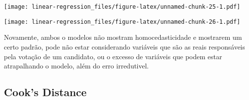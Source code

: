 \documentclass[]{article}
\newenvironment{Shaded}{\begin{snugshade}}{\end{snugshade}}
\newcommand{\KeywordTok}[1]{\textcolor[rgb]{0.13,0.29,0.53}{\textbf{#1}}}
\newcommand{\DataTypeTok}[1]{\textcolor[rgb]{0.13,0.29,0.53}{#1}}
\newcommand{\DecValTok}[1]{\textcolor[rgb]{0.00,0.00,0.81}{#1}}
\newcommand{\StringTok}[1]{\textcolor[rgb]{0.31,0.60,0.02}{#1}}
\newcommand{\OtherTok}[1]{\textcolor[rgb]{0.56,0.35,0.01}{#1}}
\newcommand{\OperatorTok}[1]{\textcolor[rgb]{0.81,0.36,0.00}{\textbf{#1}}}
\newcommand{\NormalTok}[1]{#1}
\begin{document}
\texttt{[image: linear-regression\_files/figure-latex/unnamed-chunk-25-1.pdf]}

\begin{Shaded}
\end{Shaded}

\texttt{[image: linear-regression\_files/figure-latex/unnamed-chunk-26-1.pdf]}

Novamente, ambos o modelos não mostram homocedasticidade e mostrarem um
certo padrão, pode não estar considerando variáveis que são as reais
responsáveis pela votação de um candidato, ou o excesso de variáveis que
podem estar atrapalhando o modelo, além do erro irredutivel.

\subsection{Cook's Distance}\label{cooks-distance}
\end{document}
